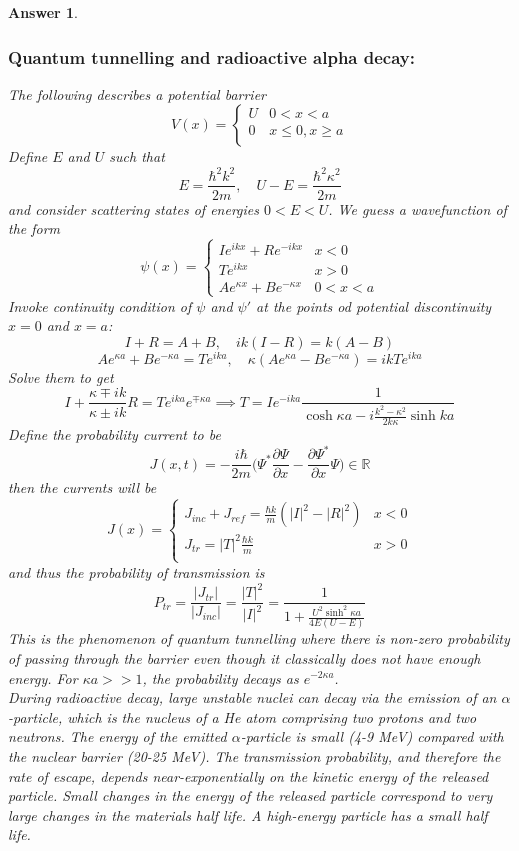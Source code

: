 \documentclass[a4paper]{article}
\newtheorem{ans}{Answer}[subsection]
\theoremstyle{new}
\begin{document}
\begin{ans}
\subsubsection*{Quantum tunnelling and radioactive alpha decay:}
The following describes a potential barrier
   $$
V(x)=
\left\{
        \begin{array}{ll}
      U & 0<x<a\\
	0& x\leq 0,x\geq a\\
        \end{array}
    \right.
$$
Define $E$ and $U$ such that
$$E=\frac{\hbar^2k^2}{2m},\quad U-E=\frac{\hbar^2\kappa^2}{2m}$$
and consider scattering states of energies $0<E<U$. We guess a wavefunction of the form
       $$
\psi(x)=
\left\{
        \begin{array}{ll}
      Ie^{ikx}+Re^{-ikx} & x<0\\
 Te^{ikx}& x>0\\
 Ae^{\kappa x}+Be^{-\kappa x}&0<x<a
        \end{array}
    \right.
$$
Invoke continuity condition of $\psi$ and $\psi'$ at the points od potential discontinuity $x=0$ and $x=a$:
$$I+R=A+B,\quad ik(I-R)=k(A-B)$$
$$Ae^{\kappa a}+Be^{-\kappa a}=Te^{ika},\quad \kappa (Ae^{\kappa a}-Be^{-\kappa a})=ikTe^{ika}$$
Solve them to get 
$$I+\frac{\kappa\mp ik}{\kappa\pm ik}R=Te^{ika}e^{\mp\kappa a}\implies T=Ie^{-ika}\frac{1}{\cosh\kappa a-i\frac{k^2-\kappa^2}{2k\kappa}\sinh ka}$$
Define the probability current to be
$$J(x,t)=-\frac{i\hbar}{2m}\bigg(\Psi^*\frac{\partial\Psi}{\partial x}-\frac{\partial\Psi^*}{\partial x}\Psi\bigg)\in\mathbb{R}$$
then the currents will be
       $$
J(x)=
\left\{
        \begin{array}{ll}
      J_{inc}+J_{ref}=\frac{\hbar k}{m}(|I|^2-|R|^2)& x<0\\
J_{tr}=|T|^2\frac{\hbar k}{m}& x>0\\
        \end{array}
    \right.
$$
and thus the probability of transmission is
$$P_{tr}=\frac{|J_{tr}|}{|J_{inc}|}=\frac{|T|^2}{|I|^2}=\frac{1}{1+\frac{U^2\sinh^2\kappa a}{4E(U-E)}}$$
This is the phenomenon of quantum tunnelling where there is non-zero probability of passing through the barrier even though it classically does not have enough energy. For $\kappa a>>1$, the probability decays as $e^{-2\kappa a}$. \\[5pt]
During radioactive decay, large unstable nuclei can decay via the emission of an $\alpha$-particle, which is the nucleus of a He atom comprising two protons and two neutrons. The energy of the emitted $\alpha$-particle is small (4-9 MeV) compared with the nuclear barrier (20-25 MeV). The transmission probability, and therefore the rate of escape, depends near-exponentially on the kinetic energy of the released particle. Small changes in the energy of the released particle correspond to very large changes in the materials half life. A high-energy particle has a small half life. 
\newpage

\end{ans}
\end{document}
